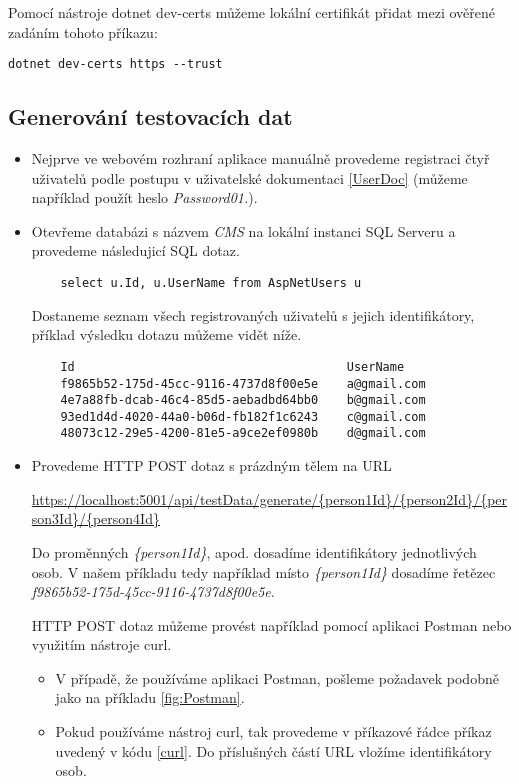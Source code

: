 Pomocí nástroje dotnet dev-certs můžeme lokální certifikát přidat mezi ověřené zadáním tohoto příkazu:
\begin{lstlisting}
dotnet dev-certs https --trust
\end{lstlisting}

\subsection{Generování testovacích dat}

\begin{itemize}
	\item Nejprve ve webovém rozhraní aplikace manuálně provedeme registraci čtyř uživatelů podle postupu v uživatelské dokumentaci \ref{UserDoc} (můžeme například použít heslo \textit{Password01.}).

	\item Otevřeme databázi s názvem \textit{CMS} na lokální instanci SQL Serveru a provedeme následujicí SQL dotaz.
	\begin{lstlisting}
	select u.Id, u.UserName from AspNetUsers u
	\end{lstlisting}
	
	Dostaneme seznam všech registrovaných uživatelů s jejich identifikátory, příklad výsledku dotazu můžeme vidět níže.
	
	\begin{lstlisting}
	Id										UserName
	f9865b52-175d-45cc-9116-4737d8f00e5e	a@gmail.com
	4e7a88fb-dcab-46c4-85d5-aebadbd64bb0	b@gmail.com
	93ed1d4d-4020-44a0-b06d-fb182f1c6243	c@gmail.com
	48073c12-29e5-4200-81e5-a9ce2ef0980b	d@gmail.com
	\end{lstlisting}
	
	\item Provedeme HTTP POST dotaz s prázdným tělem na URL
	
	\url{https://localhost:5001/api/testData/generate/{person1Id}/{person2Id}/{person3Id}/{person4Id}}
	
	Do proměnných \textit{\{person1Id\}}, apod. dosadíme identifikátory jednotlivých osob. V našem příkladu tedy například místo \textit{\{person1Id\}} dosadíme řetězec \textit{f9865b52-175d-45cc-9116-4737d8f00e5e}.
	
	HTTP POST dotaz můžeme provést například pomocí aplikaci Postman nebo využitím nástroje curl.
	
	\begin{itemize}
		\item V případě, že používáme aplikaci Postman, pošleme požadavek podobně jako na příkladu \ref{fig:Postman}.
		\item Pokud používáme nástroj curl, tak provedeme v příkazové řádce příkaz uvedený v kódu \ref{curl}. Do příslušných částí URL vložíme identifikátory osob.
	\end{itemize}


\end{itemize}
